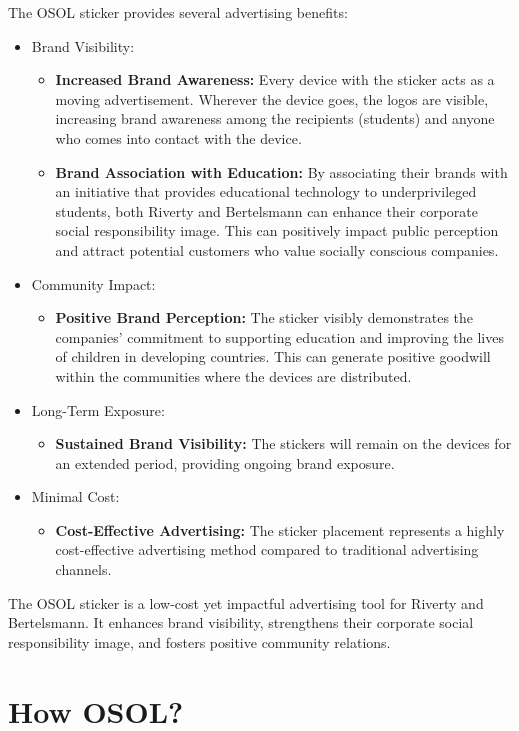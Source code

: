 \documentclass[a4paper,11pt]{article}
\begin{document}
The OSOL sticker provides several advertising benefits:
\begin{itemize}
	\item Brand Visibility:
	\begin{itemize}
		\item \textbf{Increased Brand Awareness:} Every device with the sticker acts as a moving advertisement. Wherever the device goes, the logos are visible, increasing brand awareness among the recipients (students) and anyone who comes into contact with the device.
		\item \textbf{Brand Association with Education:} By associating their brands with an initiative that provides educational technology to underprivileged students, both Riverty and Bertelsmann can enhance their corporate social responsibility image. This can positively impact public perception and attract potential customers who value socially conscious companies.
	\end{itemize}
	\item Community Impact:
	\begin{itemize}
		\item \textbf{Positive Brand Perception:} The sticker visibly demonstrates the companies' commitment to supporting education and improving the lives of children in developing countries. This can generate positive goodwill within the communities where the devices are distributed.
	\end{itemize}
	\item Long-Term Exposure:
	\begin{itemize}
		\item \textbf{Sustained Brand Visibility:} The stickers will remain on the devices for an extended period, providing ongoing brand exposure.
	\end{itemize}
	\item Minimal Cost:
	\begin{itemize}
		\item \textbf{Cost-Effective Advertising:} The sticker placement represents a highly cost-effective advertising method compared to traditional advertising channels.
	\end{itemize}
\end{itemize}

The OSOL sticker is a low-cost yet impactful advertising tool for Riverty and Bertelsmann. It enhances brand visibility, strengthens their corporate social responsibility image, and fosters positive community relations.


\section{How OSOL?}
\end{document}
